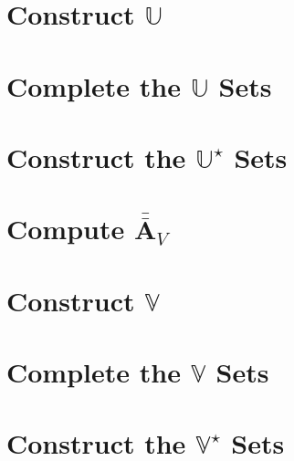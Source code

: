 \documentclass{book}[12pt]
\numberwithin{equation}{section}
\newcommand{\mat}[1]{\bar{\bar{\mathbf{#1}}}}
\begin{document}
\section{Construct $\mathbb{U}$}


\section{Complete the $\mathbb{U}$ Sets}


\newpage
\section{Construct the $\mathbb{U}^\star$ Sets}


\section{Compute $\mat{A}_V$}


\section{Construct $\mathbb{V}$}


\newpage
\section{Complete the $\mathbb{V}$ Sets}


\newpage
\section{Construct the $\mathbb{V}^\star$ Sets}

\end{document}
